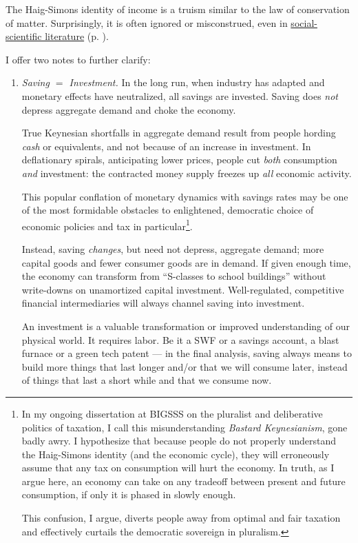 The Haig-Simons identity of income is a truism similar to the law of conservation of matter. Surprisingly, it is often ignored or misconstrued, even in \hyperref[sec:Literature]{social-scientific literature} (p. \pageref{sec:Literature}). %

I offer two notes to further clarify:
\begin{enumerate}
	\item \emph{Saving $=$ Investment.} In the long run, when industry has adapted and monetary effects have neutralized, all savings are invested. Saving does \emph{not} depress aggregate demand and choke the economy.
	
	True Keynesian shortfalls in aggregate demand result from people hording \emph{cash} or equivalents, and not because of an increase in investment. In deflationary spirals, anticipating lower prices, people cut \emph{both} consumption \emph{and} investment: the contracted money supply freezes up \emph{all} economic activity. 
	
	This popular conflation of monetary dynamics with savings rates may be one of the most formidable obstacles to enlightened, democratic choice of economic policies and tax in particular\footnote{
		In my ongoing dissertation at \gls{BIGSSS} on the pluralist and deliberative politics of taxation, I call this misunderstanding \emph{Bastard Keynesianism}, gone badly awry. I hypothesize that because people do not properly understand the Haig-Simons identity (and the economic cycle), they will erroneously assume that any tax on consumption will hurt the economy. In truth, as I argue here, an economy can take on any tradeoff between present and future consumption, if only it is phased in slowly enough.
		
		This confusion, I argue, diverts people away from optimal and fair taxation and effectively curtails the democratic sovereign in pluralism.}.
	
	Instead, saving \emph{changes}, but need not depress, aggregate demand; more capital goods and fewer consumer goods are in demand. If given enough time, the economy can transform from ``S-classes to school buildings'' without write-downs on unamortized capital investment. Well-regulated, competitive financial intermediaries will always channel saving into investment. 
	
	An investment is a valuable transformation or improved understanding of our physical world. It requires labor. Be it a \gls{SWF} or a savings account, a blast furnace or a green tech patent --- in the final analysis, saving always means to build more things that last longer and/or that we will consume later, instead of things that last a short while and that we consume now. 
	

\end{enumerate}
